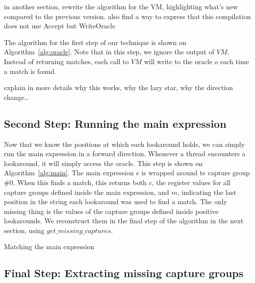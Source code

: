 \documentclass{article}
\def\regex#1{\lstinline[style=rgx]{#1}}
\def\todo#1{{\color{ACMOrange}{TODO: }}#1}
\begin{document}
\todo{in another section, rewrite the algorithm for the VM, highlighting what's new compared to the previous version.}
\todo{also find a way to express that this compilation does not use Accept but WriteOracle}

The algorithm for the first step of our technique is shown on Algorithm~\ref{alg:oracle}.
Note that in this step, we ignore the output of $\mathit{VM}$.
Instead of returning matches, each call to $\mathit{VM}$ will write to the oracle $o$ each time a match is found.

\todo{explain in more details why this works, why the lazy star, why the direction change\dots}


\subsection{Second Step: Running the main expression}

Now that we know the positions at which each lookaround holds, we can simply run the main expression in a forward direction.
Whenever a thread encounters a lookaround, it will simply access the oracle.
This step is shown on Algorithm~\ref{alg:main}.
The main expression $e$ is wrapped around te capture group \#0.
When this finds a match, this returns both $c$, the register values for all capture groups defined inside the main expression,
and $m$, indicating the last position in the string each lookaround was used to find a match.
The only missing thing is the values of the capture groups defined inside positive lookarounds.
We reconstruct them in the final step of the algorithm in the next section, using $get\_missing\_captures$.

\begin{algorithm}
\SetAlgoLined
{}
\;
\hlet{bc = compile(\regex{.*?(e)}$_{\#0}$)}\;
\;
\caption{Matching the main expression}\label{alg:main}
\end{algorithm}




\subsection{Final Step: Extracting missing capture groups}
\end{document}
